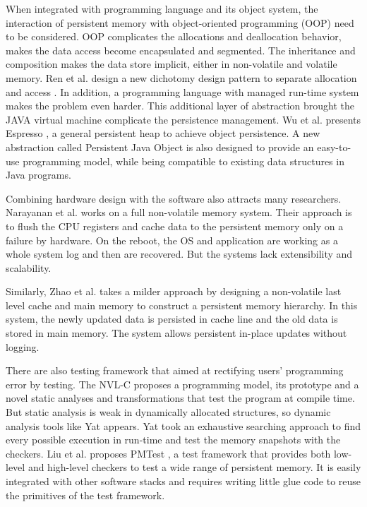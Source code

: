 \documentclass{sig-alternate}
\begin{document}
	When integrated with programming language and its object system, the interaction of persistent memory with object-oriented programming (OOP) need to be considered. OOP complicates the allocations and deallocation behavior, makes the data access become encapsulated and segmented. The inheritance and composition makes the data store implicit, either in non-volatile and volatile memory. Ren et al. design a new dichotomy design pattern to separate allocation and access \cite{Ren:2017:PNM:3124680.3124729}. In addition, a programming language with managed run-time system makes the problem even harder. This additional layer of abstraction brought the JAVA virtual machine complicate the persistence management. Wu et al. presents Espresso \cite {Wu:2018:EBJ:3173162.3173201}, a general persistent heap to achieve object persistence. A new abstraction called Persistent Java Object is also designed to provide an easy-to-use programming model, while being compatible to existing data structures in Java programs.

	Combining hardware design with the software also attracts many researchers. Narayanan et al. \cite{Narayanan:2012:WP:2248487.2151018} works on a full non-volatile memory system. Their approach is to flush the CPU registers and cache data to the persistent memory only on a failure by hardware. On the reboot, the OS and application are working as a whole system log and then are recovered. But the systems lack extensibility and scalability. 

	Similarly, Zhao et al. takes a milder approach by designing a non-volatile last level cache and main memory to construct a persistent memory hierarchy. In this system, the newly updated data is persisted in cache line and the old data is stored in main memory. The system allows persistent in-place updates without logging. 

	There are also testing framework that aimed at rectifying users’ programming error by testing. The NVL-C \cite{Denny:2016:NSA:2907294.2907303} proposes a programming model, its prototype and a novel static analyses and transformations that test the program at compile time. But static analysis is weak in dynamically allocated structures, so dynamic analysis tools like Yat \cite{Lantz2014YatAV} appears. Yat took an exhaustive searching approach to find every possible execution in run-time and test the memory snapshots with the checkers. Liu et al. proposes PMTest \cite{PMtest01}, a test framework that provides both low-level and high-level checkers to test a wide range of persistent memory. It is easily integrated with other software stacks and requires writing little glue code to reuse the primitives of the test framework.
\end{document}

